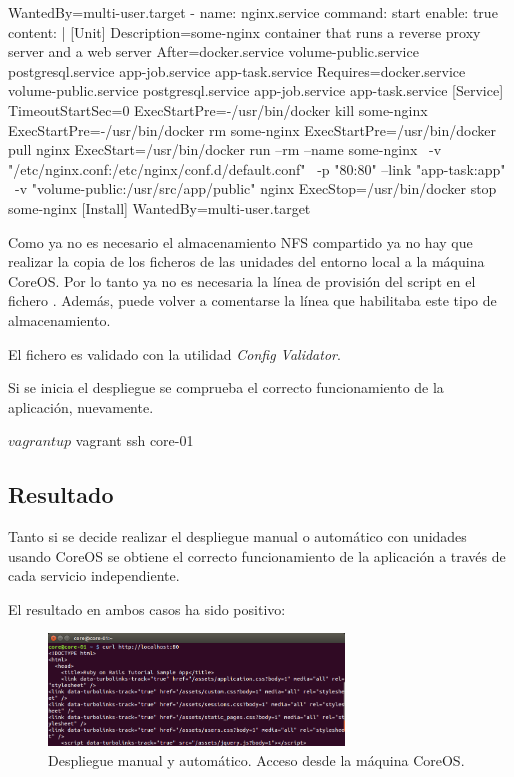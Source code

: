 \begin{codelisting}
\begin{code}
      [Install] 
      WantedBy=multi-user.target
  - name: nginx.service
    command: start
    enable: true
    content: |
      [Unit] 
      Description=some-nginx container that runs a reverse proxy server and 
                  a web server
      After=docker.service volume-public.service postgresql.service 
            app-job.service app-task.service
      Requires=docker.service volume-public.service postgresql.service 
               app-job.service app-task.service
      [Service] 
      TimeoutStartSec=0 
      ExecStartPre=-/usr/bin/docker kill some-nginx 
      ExecStartPre=-/usr/bin/docker rm some-nginx
      ExecStartPre=/usr/bin/docker pull nginx 
      ExecStart=/usr/bin/docker run --rm --name some-nginx \
      -v "/etc/nginx.conf:/etc/nginx/conf.d/default.conf" \
      -p "80:80" --link "app-task:app" \
      -v "volume-public:/usr/src/app/public" nginx 
      ExecStop=/usr/bin/docker stop some-nginx
      [Install] 
      WantedBy=multi-user.target
  \end{code}
\end{codelisting}

Como ya no es necesario el almacenamiento NFS compartido ya no hay que realizar la copia de los ficheros de las unidades del entorno local a la máquina CoreOS. Por lo tanto ya no es necesaria la línea de provisión del script en el fichero . Además, puede volver a comentarse la línea que habilitaba este tipo de almacenamiento.

El fichero es validado con la utilidad \textit{Config Validator}. 

Si se inicia el despliegue se comprueba el correcto funcionamiento de la aplicación, nuevamente.

\begin{code}
$ vagrant up
$ vagrant ssh core-01
\end{code}

\subsection{Resultado}

Tanto si se decide realizar el despliegue manual o automático con unidades usando CoreOS se obtiene el correcto funcionamiento de la aplicación a través de cada servicio independiente.

El resultado en ambos casos ha sido positivo:

\begin{figure}[H]
\centering
\includegraphics[width=0.7\textwidth]{images/figures/coreosmanualcurl.png}
\caption{Despliegue manual y automático. Acceso desde la máquina CoreOS.}
\end{figure}

